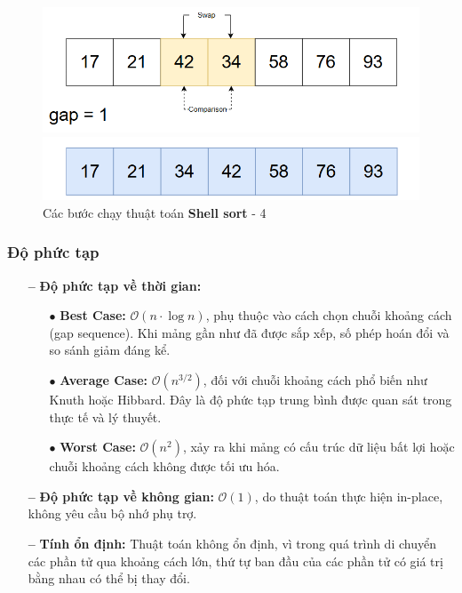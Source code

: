 \begin{figure}[H]
    \includegraphics[width=0.5\linewidth]{img/shell_sort/24.png}
    \vspace{0.15cm}

    \includegraphics[width=0.5\linewidth]{img/shell_sort/25.png}
    \caption{Các bước chạy thuật toán \textbf{Shell sort} - 4}
\end{figure}


\subsubsection{Độ phức tạp}
\begin{itemize}
    \item[\textbf{--}] \textbf{Độ phức tạp về thời gian:}
    \begin{itemize}
        \item[$\bullet$] \textbf{Best Case:} $\mathcal{O}(n \cdot \log n)$, phụ thuộc vào cách chọn chuỗi khoảng cách (gap sequence). Khi mảng gần như đã được sắp xếp, số phép hoán đổi và so sánh giảm đáng kể.
        \item[$\bullet$] \textbf{Average Case:} $\mathcal{O}(n^{3/2})$, đối với chuỗi khoảng cách phổ biến như Knuth hoặc Hibbard. Đây là độ phức tạp trung bình được quan sát trong thực tế và lý thuyết.
        \item[$\bullet$] \textbf{Worst Case:} $\mathcal{O}(n^2)$, xảy ra khi mảng có cấu trúc dữ liệu bất lợi hoặc chuỗi khoảng cách không được tối ưu hóa.
    \end{itemize}
    \item[\textbf{--}] \textbf{Độ phức tạp về không gian:} $\mathcal{O}(1)$, do thuật toán thực hiện in-place, không yêu cầu bộ nhớ phụ trợ.
    \item[\textbf{--}] \textbf{Tính ổn định:} Thuật toán không ổn định, vì trong quá trình di chuyển các phần tử qua khoảng cách lớn, thứ tự ban đầu của các phần tử có giá trị bằng nhau có thể bị thay đổi.
\end{itemize}
